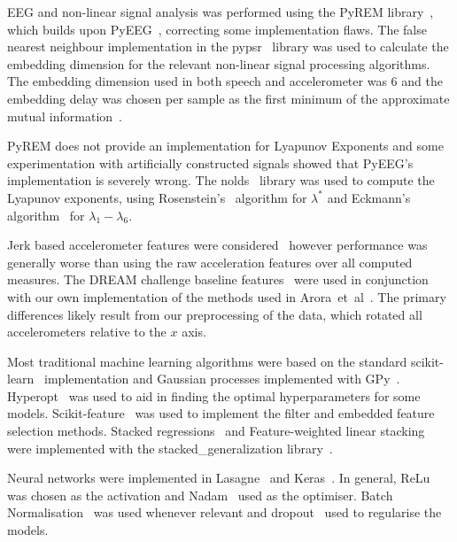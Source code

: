 \documentclass[12pt, twoside]{book}
\begin{document}
EEG and non-linear signal analysis was performed using the PyREM library~\cite{pyrem}, which builds upon PyEEG~\cite{pyeeg}, correcting some implementation flaws. The false nearest neighbour implementation in the pypsr~\cite{pypsr} library was used to calculate the embedding dimension for the relevant non-linear signal processing algorithms. The embedding dimension used in both speech and accelerometer was 6 and the embedding delay was chosen per sample as the first minimum of the approximate mutual information~\cite{rosenstein1993practicallyapunov}.
 
PyREM does not provide an implementation for Lyapunov Exponents and some experimentation with artificially constructed signals showed that PyEEG's implementation is severely wrong. The nolds~\cite{nolds} library was used to compute the Lyapunov exponents, using Rosenstein's~\cite{rosenstein1993practicallyapunov} algorithm for $\lambda^*$ and Eckmann's algorithm~\cite{eckmann1986liapunov} for $\lambda_1 - \lambda_6$.
  
Jerk based accelerometer features were considered~\cite{jerkfeature} however performance was generally worse than using the raw acceleration features over all computed measures. The DREAM challenge baseline features~\cite{mpowertools} were used in conjunction with our own implementation of the methods used in Arora~et~al~\cite{arora2014high}. The primary differences likely result from our preprocessing of the data, which rotated all accelerometers relative to the $x$ axis.


Most traditional machine learning algorithms were based on the standard scikit-learn~\cite{scikitlearn} implementation and Gaussian processes implemented with GPy~\cite{gpy2014}. Hyperopt~\cite{hyperopt} was used to aid in finding the optimal hyperparameters for some models. Scikit-feature~\cite{skfeature} was used to implement the filter and embedded feature selection methods. Stacked regressions~\cite{stackregression} and Feature-weighted linear stacking~\cite{fwls} were implemented with the stacked\_generalization library~\cite{stackedgeneralizaton}.

Neural networks were implemented in Lasagne~\cite{lasagne} and Keras~\cite{keras}. In general, ReLu~\cite{relu} was chosen as the activation and Nadam~\cite{nadam} used as the optimiser. Batch Normalisation~\cite{batchnorm} was used whenever relevant and dropout~\cite{dropout} used to regularise the models. 


\end{document}
